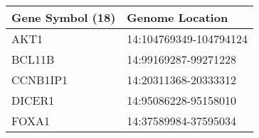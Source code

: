 \begin{tabular}{ll}
\toprule
Gene Symbol (18) &        Genome Location \\
\midrule
            AKT1 & 14:104769349-104794124 \\
          BCL11B &   14:99169287-99271228 \\
        CCNB1IP1 &   14:20311368-20333312 \\
          DICER1 &   14:95086228-95158010 \\
           FOXA1 &   14:37589984-37595034 \\
\bottomrule
\end{tabular}

